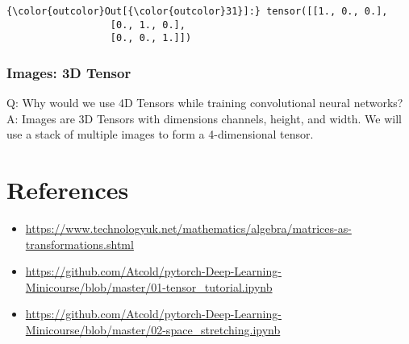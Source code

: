\begin{Verbatim}[commandchars=\\\{\}]
{\color{outcolor}Out[{\color{outcolor}31}]:} tensor([[1., 0., 0.],
                  [0., 1., 0.],
                  [0., 0., 1.]])
\end{Verbatim}
\subsubsection{Images: 3D Tensor}
Q: Why would we use 4D Tensors while training convolutional neural networks?\\
A: Images are 3D Tensors with dimensions channels, height, and width. We will use a stack of multiple images to form a 4-dimensional tensor.


\section{References}
\begin{itemize}
\tightlist
\item
\href{https://www.technologyuk.net/mathematics/algebra/matrices-as-transformations.shtml}{https://www.technologyuk.net/mathematics/algebra/matrices-as-transformations.shtml}
\item
\href{https://github.com/Atcold/pytorch-Deep-Learning-Minicourse/blob/master/01-tensor_tutorial.ipynb}{https://github.com/Atcold/pytorch-Deep-Learning-Minicourse/blob/master/01-tensor_tutorial.ipynb}
\item
\href{https://github.com/Atcold/pytorch-Deep-Learning-Minicourse/blob/master/02-space_stretching.ipynb}{https://github.com/Atcold/pytorch-Deep-Learning-Minicourse/blob/master/02-space_stretching.ipynb}
\end{itemize}